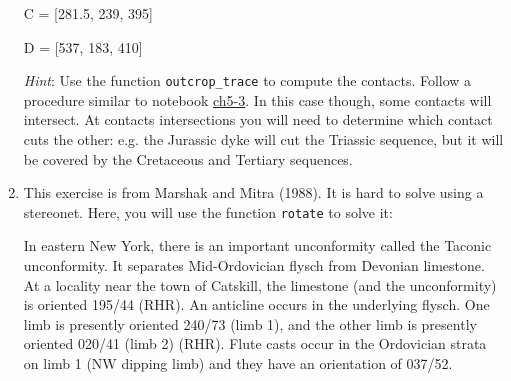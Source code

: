\documentclass[a4paper , 12pt]{book}
\newcommand{\code}[1]{\colorbox{light-gray}{\texttt{#1}}}
\begin{document}
\begin{enumerate}
    C = [281.5, 239, 395]
    
    D = [537, 183, 410]
    
    \textit{Hint}: Use the function \code{outcrop\_trace} to compute the contacts. Follow a procedure similar to notebook \href{https://github.com/nfcd/compGeo/blob/master/source/notebooks/ch5-3.ipynb}{ch5-3}. In this case though, some contacts will intersect. At contacts intersections you will need to determine which contact cuts the other: e.g. the Jurassic dyke will cut the Triassic sequence, but it will be covered by the Cretaceous and Tertiary sequences.
    
    \item This exercise is from Marshak and Mitra (1988). It is hard to solve using a stereonet. Here, you will use the function \code{rotate} to solve it:
    
    In eastern New York, there is an important unconformity called the Taconic unconformity. It separates Mid-Ordovician flysch from Devonian limestone. At a locality near the town of Catskill, the limestone (and the unconformity) is oriented 195/44 (RHR). An anticline occurs in the underlying flysch. One limb is presently oriented 240/73 (limb 1), and the other limb is presently oriented 020/41 (limb 2) (RHR). Flute casts occur in the Ordovician strata on limb 1 (NW dipping limb) and they have an orientation of 037/52.
    

\end{enumerate}
\end{document}
